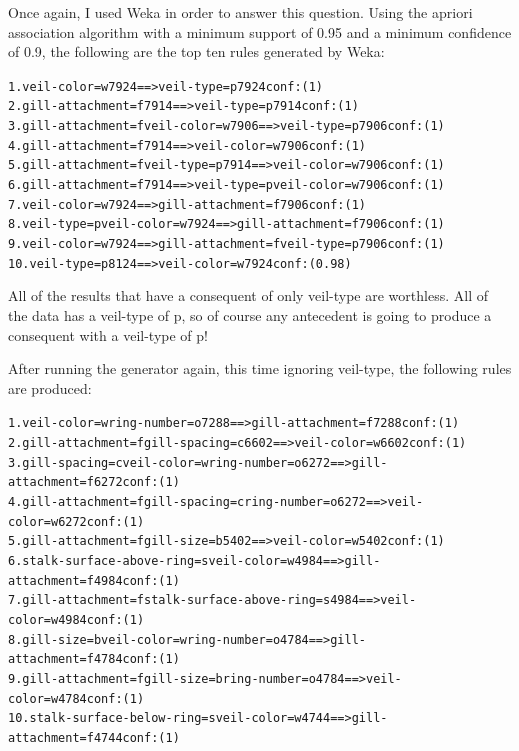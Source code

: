 \documentclass[margin,letterpaper,11pt]{scrartcl}
\begin{document}
Once again, I used Weka in order to answer this question. Using the apriori
association algorithm with a minimum support of 0.95 and a minimum confidence
of 0.9, the following are the top ten rules generated by Weka:
\begin{alltt}
 1. veil-color=w 7924 ==> veil-type=p 7924    conf:(1)
 2. gill-attachment=f 7914 ==> veil-type=p 7914    conf:(1)
 3. gill-attachment=f veil-color=w 7906 ==> veil-type=p 7906    conf:(1)
 4. gill-attachment=f 7914 ==> veil-color=w 7906    conf:(1)
 5. gill-attachment=f veil-type=p 7914 ==> veil-color=w 7906    conf:(1)
 6. gill-attachment=f 7914 ==> veil-type=p veil-color=w 7906    conf:(1)
 7. veil-color=w 7924 ==> gill-attachment=f 7906    conf:(1)
 8. veil-type=p veil-color=w 7924 ==> gill-attachment=f 7906    conf:(1)
 9. veil-color=w 7924 ==> gill-attachment=f veil-type=p 7906    conf:(1)
10. veil-type=p 8124 ==> veil-color=w 7924    conf:(0.98)
\end{alltt}

All of the results that have a consequent of only veil-type are worthless. All
of the data has a veil-type of p, so of course any antecedent is going to
produce a consequent with a veil-type of p!

After running the generator again, this time ignoring veil-type, the following
rules are produced:
\begin{alltt}
 1. veil-color=w ring-number=o 7288 ==> gill-attachment=f 7288    conf:(1)
 2. gill-attachment=f gill-spacing=c 6602 ==> veil-color=w 6602    conf:(1)
 3. gill-spacing=c veil-color=w ring-number=o 6272 ==> gill-attachment=f 6272    conf:(1)
 4. gill-attachment=f gill-spacing=c ring-number=o 6272 ==> veil-color=w 6272    conf:(1)
 5. gill-attachment=f gill-size=b 5402 ==> veil-color=w 5402    conf:(1)
 6. stalk-surface-above-ring=s veil-color=w 4984 ==> gill-attachment=f 4984    conf:(1)
 7. gill-attachment=f stalk-surface-above-ring=s 4984 ==> veil-color=w 4984    conf:(1)
 8. gill-size=b veil-color=w ring-number=o 4784 ==> gill-attachment=f 4784    conf:(1)
 9. gill-attachment=f gill-size=b ring-number=o 4784 ==> veil-color=w 4784    conf:(1)
10. stalk-surface-below-ring=s veil-color=w 4744 ==> gill-attachment=f 4744    conf:(1)
\end{alltt}
\end{document}
